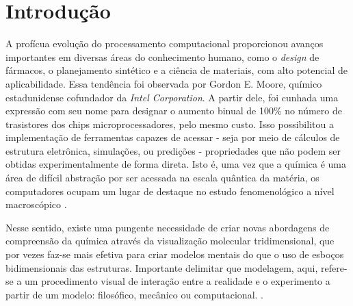 \chapter{Introdução}

A profícua evolução do processamento computacional proporcionou avanços importantes em diversas áreas do conhecimento humano, como o \textit{design} de fármacos, o planejamento sintético e a ciência de materiais, com alto potencial de aplicabilidade. Essa tendência foi observada por Gordon E. Moore, químico estadunidense 
cofundador da \textit{Intel Corporation}. A partir dele, foi cunhada uma expressão com seu nome para designar o aumento binual de 100\% no número de trasistores dos chips microprocessadores, pelo mesmo custo. Isso possibilitou a implementação de ferramentas capazes de acessar - seja por meio de cálculos de estrutura eletrônica, 
simulações, ou predições - propriedades que não podem ser obtidas experimentalmente de forma direta. Isto é, uma vez que a química é uma área de difícil abstração por ser acessada na escala quântica da matéria, os computadores ocupam um lugar de destaque no estudo fenomenológico a nível macroscópico \autocite{Allouche2010, Rayan2017}.

Nesse sentido, existe uma pungente necessidade de criar novas abordagens de compreensão da química através da visualização molecular tridimensional, que por vezes faz-se mais efetiva para criar modelos mentais do que o uso de esboços bidimensionais das estruturas. Importante delimitar que modelagem, aqui, refere-se a um procedimento visual de interação entre a realidade e o experimento a partir de um modelo: filosófico, mecânico ou computacional. \autocite{Snyder2021}.




